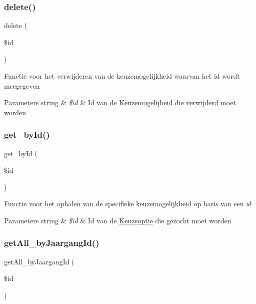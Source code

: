 \subsubsection{\texorpdfstring{delete()}{delete()}}
{\footnotesize\ttfamily delete (\begin{DoxyParamCaption}\item[{}]{\$id }\end{DoxyParamCaption})}

Functie voor het verwijderen van de keuzemogelijkheid waarvan het id wordt meegegeven 
\begin{DoxyParams}[1]{Parameters}
string & {\em \$id} & Id van de Keuzemogelijheid die verwijderd moet worden \\
\hline
\end{DoxyParams}
\mbox{\label{class_keuzemogelijkheid___model_a98d28a4d9a29d40c5a8aa0176f19a919}} 
\subsubsection{\texorpdfstring{get\+\_\+by\+Id()}{get\_byId()}}
{\footnotesize\ttfamily get\+\_\+by\+Id (\begin{DoxyParamCaption}\item[{}]{\$id }\end{DoxyParamCaption})}

Functie voor het ophalen van de specifieke keuzemogelijkheid op basis van een id 
\begin{DoxyParams}[1]{Parameters}
string & {\em \$id} & Id van de \mbox{\hyperlink{class_keuzeoptie}{Keuzeoptie}} die gezocht moet worden \\
\hline
\end{DoxyParams}
\mbox{\label{class_keuzemogelijkheid___model_aa7334b3aaafdacd36e91e44a83e668c3}} 
\subsubsection{\texorpdfstring{get\+All\+\_\+by\+Jaargang\+Id()}{getAll\_byJaargangId()}}
{\footnotesize\ttfamily get\+All\+\_\+by\+Jaargang\+Id (\begin{DoxyParamCaption}\item[{}]{\$id }\end{DoxyParamCaption})}

